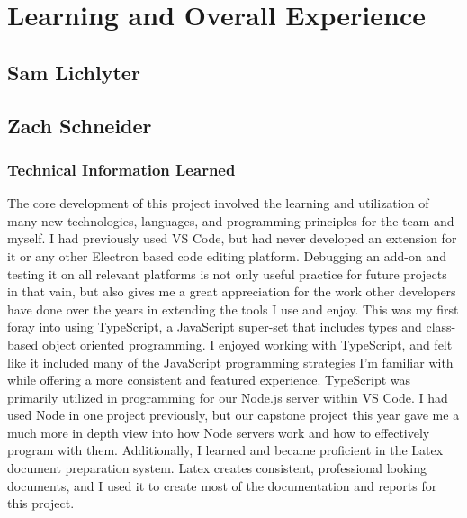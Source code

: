 \documentclass[letterpaper,10pt,titlepage,draftclsnofoot,onecolumn,onesided] {IEEEtran}
\begin{document}
\section{Learning and Overall Experience}

\subsection{Sam Lichlyter}

\subsection{Zach Schneider}
\subsubsection{Technical Information Learned}
The core development of this project involved the learning and utilization of many new technologies, languages, and programming principles for the team and myself.
I had previously used VS Code, but had never developed an extension for it or any other Electron based code editing platform.
Debugging an add-on and testing it on all relevant platforms is not only useful practice for future projects in that vain, but also gives me a great appreciation for the work other developers have done over the years in extending the tools I use and enjoy.
This was my first foray into using TypeScript, a JavaScript super-set that includes types and class-based object oriented programming. I enjoyed working with TypeScript, and felt like it included many of the JavaScript programming strategies I'm familiar with while offering a more consistent and featured experience.
TypeScript was primarily utilized in programming for our Node.js server within VS Code.
I had used Node in one project previously, but our capstone project this year gave me a much more in depth view into how Node servers work and how to effectively program with them.
Additionally, I learned and became proficient in the Latex document preparation system.
Latex creates consistent, professional looking documents, and I used it to create most of the documentation and reports for this project.
\end{document}
